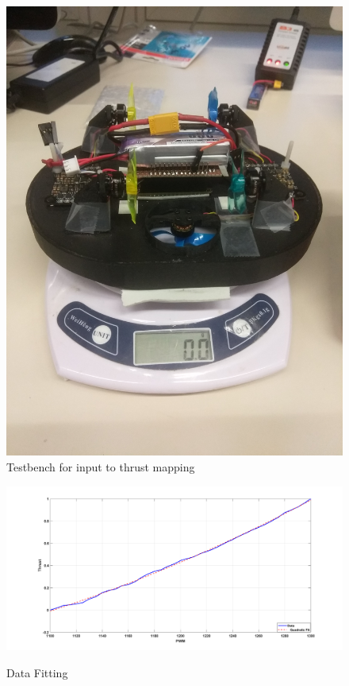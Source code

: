 \documentclass[12pt,titlepage]{article}
\begin{document}
\begin{figure}[H]
\begin{minipage}{.4\textwidth}
  \centering
    \includegraphics[width=0.6\columnwidth]{Images/motor_torque.jpg}\\
    \caption{Testbench for input to thrust mapping}
    \label{fig:experim_motor}
    \end{minipage}%
\begin{minipage}{.6\textwidth}
  \centering
    \includegraphics[width=1\columnwidth]{Images/motor_torque.png}\\
    \caption{Data Fitting}
    \label{fig:data_motor}
    \end{minipage}%
\end{figure}
\end{document}
